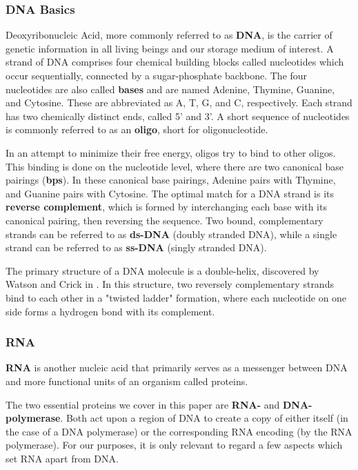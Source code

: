 \documentclass[a4paper,conference]{IEEEtran}
\begin{document}
\subsubsection{DNA Basics}
Deoxyribonucleic Acid, more commonly referred to as \textbf{DNA}, is the carrier of genetic information in all living beings and our storage medium of interest. A strand of DNA comprises four chemical building blocks called nucleotides which occur sequentially, connected by a sugar-phosphate backbone. The four nucleotides are also called \textbf{bases} and are named Adenine, Thymine, Guanine, and Cytosine. These are abbreviated as A, T, G, and C, respectively. Each strand has two chemically distinct ends, called 5' and 3'. A short sequence of nucleotides is commonly referred to as an \textbf{oligo}, short for oligonucleotide.

In an attempt to minimize their free energy, oligos try to bind to other oligos. This binding is done on the nucleotide level, where there are two canonical base pairings (\textbf{bps}). In these canonical base pairings, Adenine pairs with Thymine, and Guanine pairs with Cytosine. The optimal match for a DNA strand is its \textbf{reverse complement}, which is formed by interchanging each base with its canonical pairing, then reversing the sequence. Two bound, complementary strands can be referred to as \textbf{ds-DNA} (doubly stranded DNA), while a single strand can be referred to as \textbf{ss-DNA} (singly stranded DNA).

The primary structure of a DNA molecule is a double-helix, discovered by Watson and Crick in \cite{doublehelix}. In this structure, two reversely complementary strands bind to each other in a "twisted ladder" formation, where each nucleotide on one side forms a hydrogen bond with its complement.

\subsubsection{RNA}

\textbf{RNA} is another nucleic acid that primarily serves as a messenger between DNA and more functional units of an organism called proteins.

The two essential proteins we cover in this paper are \textbf{RNA-} and \textbf{DNA-polymerase}. Both act upon a region of DNA to create a copy of either itself (in the case of a DNA polymerase) or the corresponding RNA encoding (by the RNA polymerase). For our purposes, it is only relevant to regard a few aspects which set RNA apart from DNA.
\end{document}
